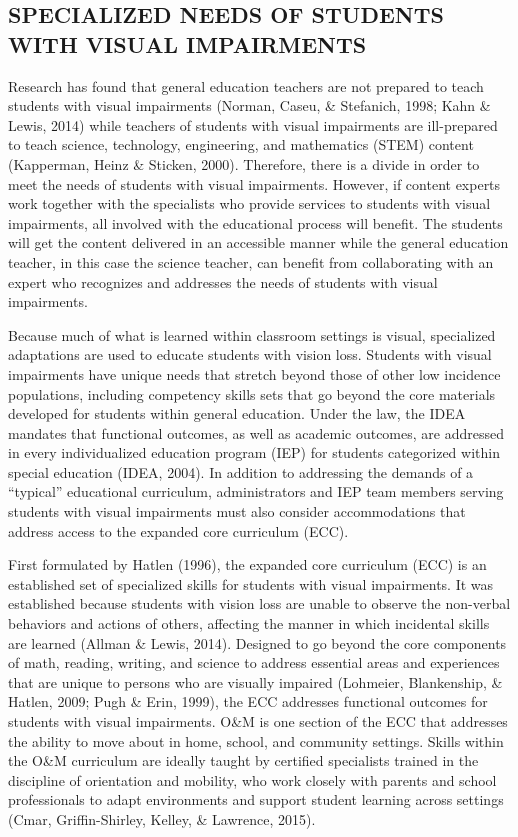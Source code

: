 \documentclass[11.5pt]{sig-alternate} %
\begin{document}
\begin{large}
\section*{SPECIALIZED NEEDS OF STUDENTS WITH VISUAL IMPAIRMENTS}

Research has found that general education teachers are not prepared to teach students with visual impairments (Norman, Caseu, \& Stefanich, 1998; Kahn \& Lewis, 2014) while teachers of students with visual impairments are ill-prepared to teach science, technology, engineering, and mathematics (STEM) content (Kapperman, Heinz \& Sticken, 2000).  Therefore, there is a divide in order to meet the needs of students with visual impairments.  However, if content experts work together with the specialists who provide services to students with visual impairments, all involved with the educational process will benefit.  The students will get the content delivered in an accessible manner while the general education teacher, in this case the science teacher, can benefit from collaborating with an expert who recognizes and addresses the needs of students with visual impairments.  

Because much of what is learned within classroom settings is visual, specialized adaptations are used to educate students with vision loss.  Students with visual impairments have unique needs that stretch beyond those of other low incidence populations, including competency skills sets that go beyond the core materials developed for students within general education.  Under the law, the IDEA mandates that functional outcomes, as well as academic outcomes, are addressed in every individualized education program (IEP) for students categorized within special education (IDEA, 2004).  In addition to addressing the demands of a “typical” educational curriculum, administrators and IEP team members serving students with visual impairments must also consider accommodations that address access to the expanded core curriculum (ECC).
	
 First formulated by Hatlen (1996), the expanded core curriculum (ECC) is an established set of specialized skills for students with visual impairments.  It was established because students with vision loss are unable to observe the non-verbal behaviors and actions of others, affecting the manner in which incidental skills are learned (Allman \& Lewis, 2014).  Designed to go beyond the core components of math, reading, writing, and science to address essential areas and experiences that are unique to persons who are visually impaired (Lohmeier, Blankenship, \& Hatlen, 2009; Pugh \& Erin, 1999), the ECC addresses functional outcomes for students with visual impairments. O\&M is one section of the ECC that addresses the ability to move about in home, school, and community settings. Skills within the O\&M curriculum are ideally taught by certified specialists trained in the discipline of orientation and mobility, who work closely with parents and school professionals to adapt environments and support student learning across settings (Cmar, Griffin-Shirley, Kelley, \& Lawrence, 2015).
 

\end{large}
\end{document}
